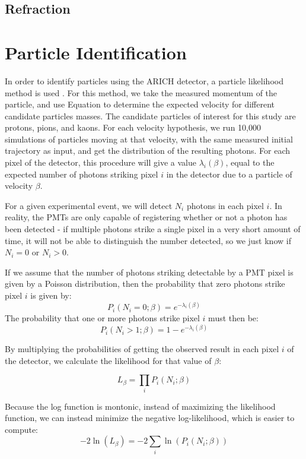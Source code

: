 \subsection{Refraction}


\section{Particle Identification}
\label{sec:particleIdentification}
In order to identify particles using the \ac{ARICH} detector, a particle likelihood method is used \cite{richImpact, belleArich}.
For this method, we take the measured momentum of the particle, and use Equation  to determine the expected velocity for different candidate particles masses.
The candidate particles of interest for this study are protons, pions, and kaons.
For each velocity hypothesis, we run 10,000 simulations of particles moving at that velocity, with the same measured initial trajectory as input, and get the distribution of the resulting photons.
For each pixel of the detector, this procedure will give a value $\lambda_i(\beta)$, equal to the expected number of photons striking pixel $i$ in the detector due to a particle of velocity $\beta$. 

For a given experimental event, we will detect $N_i$ photons in each pixel $i$.
In reality, the PMTs are only capable of registering whether or not a photon has been detected - if multiple photons strike a single pixel in a very short amount of time, it will not be able to distinguish the number detected, so we just know if $N_i = 0$ or $N_i > 0$.

If we assume that the number of photons striking detectable by a PMT pixel is given by a Poisson distribution, then the probability that zero photons strike pixel $i$ is given by:
$$ P_i(N_i=0; \beta) = e^{-\lambda_i(\beta)} $$
 The probability that one or more photons strike pixel $i$ must then be:
$$ P_i(N_i>1; \beta) = 1 - e^{-\lambda_i(\beta)} $$

By multiplying the probabilities of getting the observed result in each pixel $i$ of the detector, we calculate the likelihood for that value of $\beta$:

$$L_\beta = \prod_{i}P_i(N_i; \beta)$$

Because the log function is montonic, instead of maximizing the likelihood function, we can instead minimize the negative log-likelihood, which is easier to compute:
\begin{equation}
    \label{eq:loglikelihood}
    -2\ln(L_\beta) = -2\sum_i \ln(P_i(N_i; \beta))
\end{equation}

